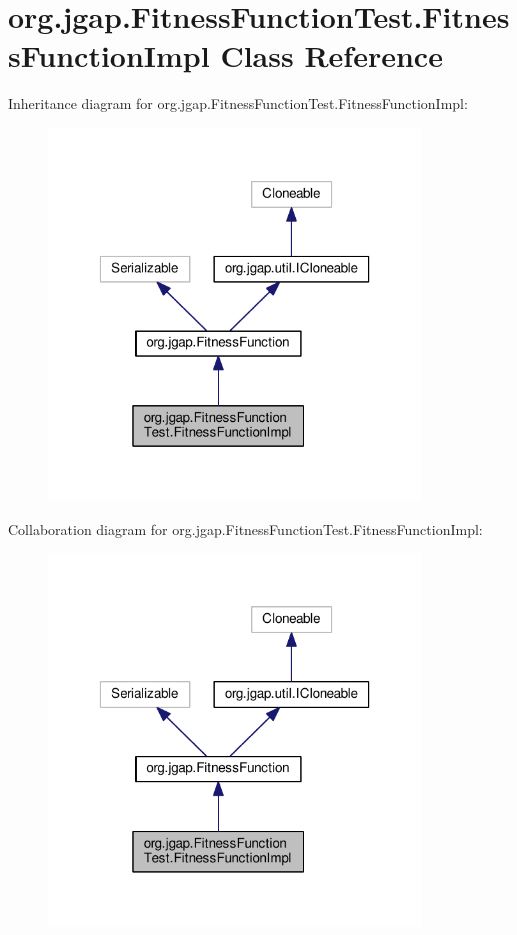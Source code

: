 \hypertarget{classorg_1_1jgap_1_1_fitness_function_test_1_1_fitness_function_impl}{\section{org.\-jgap.\-Fitness\-Function\-Test.\-Fitness\-Function\-Impl Class Reference}
\label{classorg_1_1jgap_1_1_fitness_function_test_1_1_fitness_function_impl}
}


Inheritance diagram for org.\-jgap.\-Fitness\-Function\-Test.\-Fitness\-Function\-Impl\-:
\nopagebreak
\begin{figure}[H]
\begin{center}
\leavevmode
\includegraphics[width=280pt]{classorg_1_1jgap_1_1_fitness_function_test_1_1_fitness_function_impl__inherit__graph}
\end{center}
\end{figure}


Collaboration diagram for org.\-jgap.\-Fitness\-Function\-Test.\-Fitness\-Function\-Impl\-:
\nopagebreak
\begin{figure}[H]
\begin{center}
\leavevmode
\includegraphics[width=280pt]{classorg_1_1jgap_1_1_fitness_function_test_1_1_fitness_function_impl__coll__graph}
\end{center}
\end{figure}
